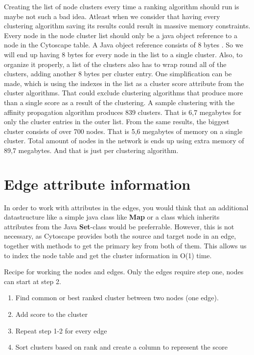Creating the list of node clusters every time a ranking algorithm should run is
maybe not such a bad idea. Atleast when we consider that having every clustering
algorithm saving its results could result in massive memory constraints. Every
node in the node cluster list should only be a java object reference to a node
in the Cytoscape table. A Java object reference consists of 8 bytes
\cite{java-reference-size}. So we will end up having 8 bytes for every node in
the list to a single cluster. Also, to organize it properly, a list of the
clusters also has to wrap round all of the clusters, adding another 8 bytes per
cluster entry. One simplification can be made, which is using the indexes in the
list as a cluster score attribute from the cluster algorithms. That could
exclude clustering algorithms that produce more than a single score as a result
of the clustering. A sample clustering with the affinity propagation algorithm
produces 839 clusters. That is 6,7 megabytes for only the cluster entries in the
outer list. From the same results, the biggest cluster consists of over 700
nodes. That is 5,6 megabytes of memory on a single cluster. Total amount of
nodes in the network is ends up using extra memory of 89,7 megabytes. And that
is just per clustering algorithm.

\section{Edge attribute information}
In order to work with attributes in the edges, you would think that an
additional datastructure like a simple java class like \textbf{Map} or a class
which inherits attributes from the Java \textbf{Set}-class\cite{java-set} would
be preferrable. However, this is not necessary, as Cytoscape provides both the
source and target node in an edge, together with methods to get the primary key
from both of them. This allows us to index the node table and get the cluster
information in O(1) time.

Recipe for working the nodes and edges. Only the edges require step one, nodes
can start at step 2.

\begin{enumerate}
    \item Find common or best ranked cluster between two nodes (one edge).
    \item Add score to the cluster
    \item Repeat step 1-2 for every edge
    \item Sort clusters based on rank and create a column to represent the score
\end{enumerate}

